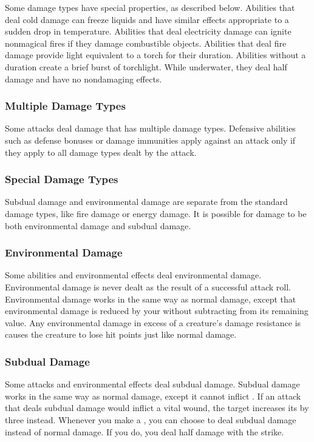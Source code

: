             Some damage types have special properties, as described below.
             Abilities that deal cold damage can freeze liquids and have similar effects appropriate to a sudden drop in temperature.
             Abilities that deal electricity damage can ignite nonmagical fires if they damage combustible objects.
             Abilities that deal fire damage provide light equivalent to a torch for their duration.
            Abilities without a duration create a brief burst of torchlight.
            While underwater, they deal half damage and have no nondamaging effects.

        \subsubsection{Multiple Damage Types}\label{Multiple Damage Types}
            Some attacks deal damage that has multiple damage types.
            Defensive abilities such as defense bonuses or damage immunities apply against an attack only if they apply to all damage types dealt by the attack.

    \subsubsection{Special Damage Types}\label{Special Damage Types}

        Subdual damage and environmental damage are separate from the standard damage types, like fire damage or energy damage.
        It is possible for damage to be both environmental damage and subdual damage.

        \subsubsection{Environmental Damage}\label{Environmental Damage}
            Some abilities and environmental effects deal environmental damage.
            Environmental damage is never dealt as the result of a successful attack roll.
            Environmental damage works in the same way as normal damage, except that environmental damage is reduced by your  without subtracting from its remaining value.
            Any environmental damage in excess of a creature's damage resistance is causes the creature to lose hit points just like normal damage.

        \subsubsection{Subdual Damage}\label{Subdual Damage}
            Some attacks and environmental effects deal subdual damage.
            Subdual damage works in the same way as normal damage, except it cannot inflict .
            If an attack that deals subdual damage would inflict a vital wound, the target increases its  by three instead.
            Whenever you make a , you can choose to deal subdual damage instead of normal damage.
            If you do, you deal half damage with the strike.

